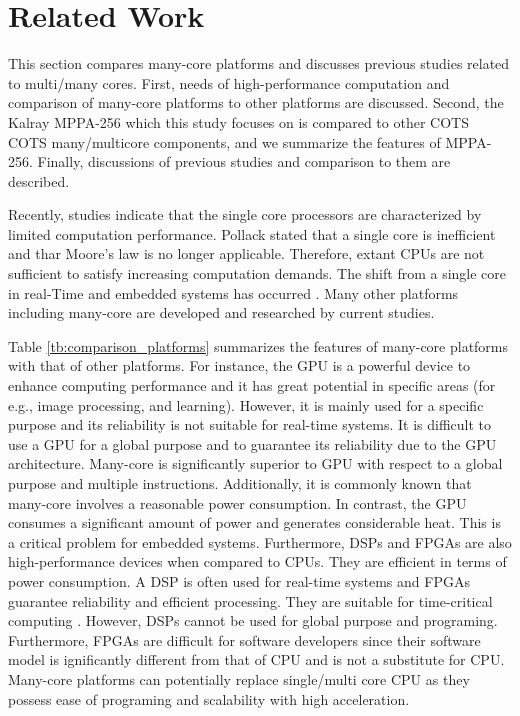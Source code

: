 \documentclass{sig-alternate-05-2015}
\begin{document}
\section{Related Work}
\label{sec:related work}
This section compares many-core platforms and discusses previous studies related to multi/many cores.
First, needs of high-performance computation and comparison of many-core platforms to other platforms are discussed.
Second, the Kalray MPPA-256 which this study focuses on is compared to other COTS COTS many/multicore components, and we summarize the features of MPPA-256.
Finally, discussions of previous studies and comparison to them are described.

Recently, studies indicate that the single core processors are characterized by limited computation performance.
Pollack stated that a single core is inefficient \cite{pollack1999new} and thar Moore's law \cite{moore2006cramming} is no longer applicable. 
Therefore, extant CPUs are not sufficient to satisfy increasing computation demands.
The shift from a single core in real-Time and embedded systems has occurred \cite{saidi2015shift}. 
Many other platforms including many-core are developed and researched by current studies.

Table \ref{tb:comparison_platforms} summarizes the features of many-core platforms with that of other platforms.
For instance, the GPU is a powerful device to enhance computing performance and it has great potential in specific areas (for e.g., image processing, and learning).
However, it is mainly used for a specific purpose and its reliability is not suitable for real-time systems.
It is difficult to use a GPU for a global purpose and to guarantee its reliability due to the GPU architecture.
Many-core is significantly superior to GPU with respect to a global purpose and multiple instructions.
Additionally, it is commonly known that many-core involves a reasonable power consumption.
In contrast, the GPU consumes a significant amount of power and generates considerable heat.
This is a critical problem for embedded systems.
Furthermore, DSPs and FPGAs are also high-performance devices when compared to CPUs.
They are efficient in terms of power consumption.
A DSP is often used for real-time systems and FPGAs guarantee reliability and efficient processing.
They are suitable for time-critical computing \cite{de2015kalray}.
However, DSPs cannot be used for global purpose and programing.
Furthermore, FPGAs are difficult for software developers since their software model is ignificantly different from that of CPU and is not a substitute for CPU.
Many-core platforms can potentially replace single/multi core CPU as they possess ease of programing and scalability with high acceleration.
\end{document}
